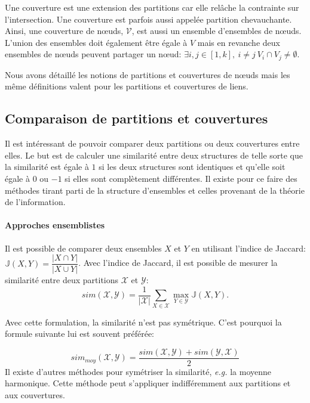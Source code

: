 Une couverture est une extension des partitions car elle relâche la contrainte sur l'intersection.
Une couverture est parfois aussi appelée partition chevauchante.
Ainsi, une couverture de n\oe uds, $\mathcal{V}$, est aussi un ensemble d'ensembles de n\oe uds.
L'union des ensembles doit également être égale à $V$ mais en revanche deux ensembles de n\oe uds peuvent partager un n\oe ud: $\exists i,j \in [1,k],\ i \neq j\ V_i \cap V_j \neq \emptyset$.

Nous avons détaillé les notions de partitions et couvertures de n\oe uds mais les même définitions valent pour les partitions et couvertures de liens.

\subsection{Comparaison de partitions et couvertures}
Il est intéressant de pouvoir comparer deux partitions ou deux couvertures entre elles.
Le but est de calculer une similarité entre deux structures de telle sorte que la similarité est égale à $1$ si les deux structures sont identiques et qu'elle soit égale à $0$ ou $-1$ si elles sont complètement différentes.
Il existe pour ce faire des méthodes tirant parti de la structure d'ensembles et celles provenant de la théorie de l'information.

\paragraph{Approches ensemblistes}
\label{def:graphe_comparaison}
Il est possible de comparer deux ensembles $X$ et $Y$ en utilisant l'indice de Jaccard: $\mathbb{J}(X,Y) = \dfrac{|X \cap Y|}{|X \cup Y|}$.
Avec l'indice de Jaccard, il est possible de mesurer la similarité entre deux partitions $\mathcal{X}$ et $\mathcal{Y}$:
\begin{equation}
sim(\mathcal{X},\mathcal{Y})=\frac{1}{|\mathcal{X}|}\sum_{X \in \mathcal{X}}\max_{Y\in \mathcal{Y}}\mathbb{J}(X,Y).
\end{equation}

Avec cette formulation, la similarité n'est pas symétrique.
C'est pourquoi la formule suivante lui est souvent préférée:

\begin{equation}
sim_{moy}(\mathcal{X},\mathcal{Y}) = \dfrac{sim(\mathcal{X},\mathcal{Y})+sim(\mathcal{Y},\mathcal{X})}{2}
\end{equation}
Il existe d'autres méthodes pour symétriser la similarité, \emph{e.g.} la moyenne harmonique.
Cette méthode peut s'appliquer indifféremment aux partitions et aux couvertures.

